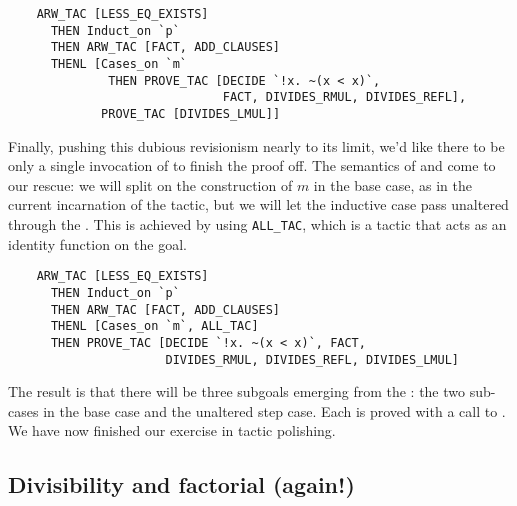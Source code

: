 {\small\begin{verbatim}
    ARW_TAC [LESS_EQ_EXISTS]
      THEN Induct_on `p`
      THEN ARW_TAC [FACT, ADD_CLAUSES]
      THENL [Cases_on `m`
              THEN PROVE_TAC [DECIDE `!x. ~(x < x)`,
                              FACT, DIVIDES_RMUL, DIVIDES_REFL],
             PROVE_TAC [DIVIDES_LMUL]]
\end{verbatim}}

\noindent
Finally, pushing this dubious revisionism nearly to its limit, we'd
like there to be only a single invocation of  to finish
the proof off. The semantics of  and  come to
our rescue: we will split on the construction of $m$ in the base case,
as in the current incarnation of the tactic, but we will let the
inductive case pass unaltered through the . This is achieved
by using \verb+ALL_TAC+, which is a tactic that acts as an identity
function on the goal.
{\small\begin{verbatim}
    ARW_TAC [LESS_EQ_EXISTS]
      THEN Induct_on `p`
      THEN ARW_TAC [FACT, ADD_CLAUSES]
      THENL [Cases_on `m`, ALL_TAC]
      THEN PROVE_TAC [DECIDE `!x. ~(x < x)`, FACT,
                      DIVIDES_RMUL, DIVIDES_REFL, DIVIDES_LMUL]
\end{verbatim}}

\noindent
The result is that there will be three subgoals emerging from the
: the two sub-cases in the base case and the unaltered step
case. Each is proved with a call to . We have now
finished our exercise in tactic polishing.

\subsection{Divisibility and factorial (again!)}

